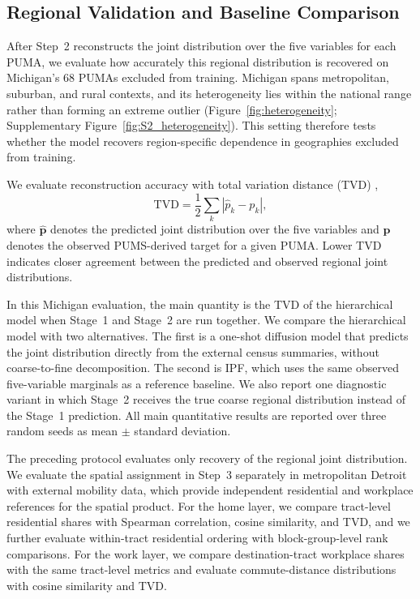 \documentclass[11pt]{article}
\begin{document}
\subsection{Regional Validation and Baseline Comparison}
\label{sec:experiment}

After Step~2 reconstructs the joint distribution over the five variables for each PUMA, we evaluate how accurately this regional distribution is recovered on Michigan's 68 PUMAs excluded from training. Michigan spans metropolitan, suburban, and rural contexts, and its heterogeneity lies within the national range rather than forming an extreme outlier (Figure~\ref{fig:heterogeneity}; Supplementary Figure~\ref{fig:S2_heterogeneity}). This setting therefore tests whether the model recovers region-specific dependence in geographies excluded from training.

We evaluate reconstruction accuracy with total variation distance (TVD) \cite{lovelace2015},
\[
  \text{TVD} = \frac{1}{2}\sum_k|\hat{p}_k-p_k| ,
\]
where $\hat{\mathbf{p}}$ denotes the predicted joint distribution over the five variables and $\mathbf{p}$ denotes the observed PUMS-derived target for a given PUMA. Lower TVD indicates closer agreement between the predicted and observed regional joint distributions.

In this Michigan evaluation, the main quantity is the TVD of the hierarchical model when Stage~1 and Stage~2 are run together. We compare the hierarchical model with two alternatives. The first is a one-shot diffusion model that predicts the joint distribution directly from the external census summaries, without coarse-to-fine decomposition. The second is IPF, which uses the same observed five-variable marginals as a reference baseline. We also report one diagnostic variant in which Stage~2 receives the true coarse regional distribution instead of the Stage~1 prediction. All main quantitative results are reported over three random seeds as mean $\pm$ standard deviation.

The preceding protocol evaluates only recovery of the regional joint distribution. We evaluate the spatial assignment in Step~3 separately in metropolitan Detroit with external mobility data, which provide independent residential and workplace references for the spatial product. For the home layer, we compare tract-level residential shares with Spearman correlation, cosine similarity, and TVD, and we further evaluate within-tract residential ordering with block-group-level rank comparisons. For the work layer, we compare destination-tract workplace shares with the same tract-level metrics and evaluate commute-distance distributions with cosine similarity and TVD.
\end{document}
